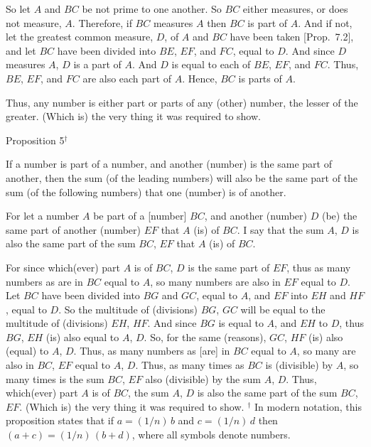 \epsfysize=2in
\centerline{}

So let  $A$ and $BC$  be not prime to one another. So $BC$ either measures, or
does not measure, $A$. Therefore, if $BC$ measures $A$ then $BC$ is part of
$A$. And if not, let the greatest common measure, $D$, of $A$ and
$BC$ have been taken [Prop.~7.2], and
let $BC$ have been divided into $BE$, $EF$, and $FC$, equal to $D$. And since
$D$ measures $A$, $D$ is a part of $A$. And $D$ is equal to each of $BE$, $EF$, and
$FC$. Thus, $BE$, $EF$, and $FC$ are also each part of $A$. Hence, $BC$ is parts of $A$.

Thus, any number is either part or parts of any (other) number, the
lesser of the greater. (Which is) the very thing it was required to show.


\begin{center}
{\large Proposition 5}$^\dag$
\end{center}

If a number is part of a number, and another
(number) is the same part of another, then the sum (of the leading numbers) will also be the
same part of the sum (of the following numbers) that one (number) is of another.

\epsfysize=2in
\centerline{}

For let a number $A$ be part of a [number] $BC$, and another (number)
$D$ (be) the same part of another (number) $EF$ that $A$ (is) of $BC$. I say that
the sum  $A$, $D$ is also the same part of the sum $BC$, $EF$ that
$A$ (is) of $BC$.

For since which(ever) part $A$ is of $BC$, $D$ is the same part of $EF$, thus as many
numbers as are in $BC$ equal to $A$, so many numbers are also in 
$EF$ equal to $D$. Let $BC$ have been divided into $BG$ and $GC$, equal to $A$, and
$EF$ into $EH$ and $HF$, equal to $D$. So the multitude of (divisions) $BG$,
$GC$ will be equal to the multitude of (divisions) $EH$, $HF$. And
since $BG$ is equal to $A$, and $EH$ to $D$, thus $BG$, $EH$ (is) also equal to $A$, $D$.
So, for the same (reasons), $GC$, $HF$ (is) also (equal) to $A$, $D$. Thus,
as many numbers as [are] in $BC$ equal to $A$, so many are
also in $BC$, $EF$ equal to $A$, $D$. Thus, as many times as $BC$ is (divisible)
by $A$, so many times is the sum $BC$, $EF$ also (divisible)  by the sum $A$, $D$.
Thus, which(ever) part $A$ is of $BC$, the sum $A$, $D$ is also the same
part of the sum $BC$, $EF$. (Which is) the very thing it was required to show.
{\footnotesize\noindent$^\dag$ In modern notation, this
proposition states that if $a = (1/n)\,b$ and $c = (1/n)\,d$ then $(a+c) = (1/n)\,(b+d)$,
where all symbols denote numbers.}

